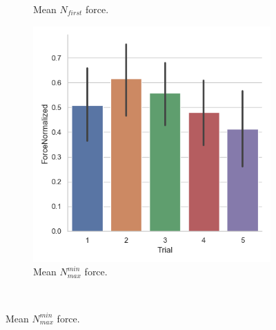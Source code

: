 \begin{figure}[H]
\begin{subfigure}[b]{0.3\textwidth}
         \caption{Mean $N_{first}$ force.}
     \label{fig:forceN1Trial}
     \end{subfigure}
     \hspace{7mm}
      \begin{subfigure}[b]{0.3\textwidth}
         \centering
     \includegraphics[scale=0.4]{Files/Plots/forceNormalized_mean_by_trial.png}
         \caption{Mean $N_{max}^{min}$ force.}
     \label{fig:forceN2Trial}
     \end{subfigure} \\
     

\end{figure}
